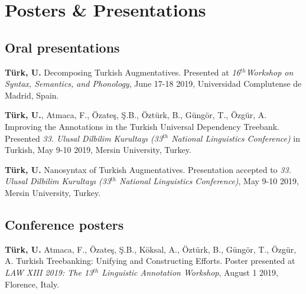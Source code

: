 \documentclass[10t, a4paper]{article}
\newcommand{\years}[1]{\marginnote{\scriptsize #1}}
\begin{document}


\section*{\faMicrophone \thinspace Posters \& Presentations}

\subsection*{Oral presentations}
\noindent

\years{2019}\textbf{Türk, U.} Decomposing Turkish Augmentatives. Presented at \textit{16$^{th}$Workshop on Syntax, Semantics, and Phonology}, June 17-18 2019, Universidad Complutense de Madrid, Spain.

\years{}\textbf{Türk, U.}, Atmaca, F., \"{O}zate\c{s}, \c{S}.B., \"{O}zt\"{u}rk, B., G\"{u}ng\"{o}r, T., \"{O}zg\"{u}r, A. Improving the Annotations in the Turkish Universal Dependency Treebank. Presented \textit{33. Ulusal Dilbilim Kurultayı (33$^{th}$ National Linguistics Conference)} in Turkish, May 9-10 2019, Mersin University, Turkey.

\years{}\textbf{Türk, U.} Nanosyntax of Turkish Augmentatives. Presentation accepted to \textit{33. Ulusal Dilbilim Kurultayı (33$^{th}$ National Linguistics Conference)}, May 9-10 2019, Mersin University, Turkey.


\subsection*{Conference posters}
\noindent

\years{2019}\textbf{Türk, U.} Atmaca, F., \"{O}zate\c{s}, \c{S}.B., Köksal, A., \"{O}zt\"{u}rk, B., G\"{u}ng\"{o}r, T., \"{O}zg\"{u}r, A. Turkish Treebanking: Unifying and Constructing Efforts. Poster presented at  \textit{LAW XIII 2019: The 13$^{th}$ Linguistic Annotation Workshop}, August 1 2019, Florence, Italy.
\end{document}
